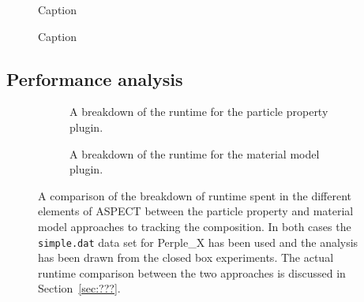 \begin{figure}
    \centering
    
    \caption{}
    \label{fig:decompression_batch}
\end{figure}

\begin{figure}
    \centering
    
    \caption{Caption}
    \label{fig:decompression_frac}
\end{figure}

\begin{figure}
    \centering
    
    \caption{Caption}
    \label{fig:decompression_2pp}
\end{figure}

\subsection{Performance analysis}

\begin{figure}
    \centering
    \begin{subfigure}{0.49\columnwidth}
        \centering
        \caption{A breakdown of the runtime for the particle property plugin.}
        \label{fig:perf_batch_pie}
    \end{subfigure}
    \hfill
    \begin{subfigure}{0.49\columnwidth}
        \centering
        \caption{A breakdown of the runtime for the material model plugin.}
        \label{fig:perf_2pp_pie}
    \end{subfigure}
    \caption{
        A comparison of the breakdown of runtime spent in the different elements of ASPECT between the particle property and material model approaches to tracking the composition.
        In both cases the \texttt{simple.dat} data set for Perple\_X has been used and the analysis has been drawn from the closed box experiments.
        The actual runtime comparison between the two approaches is discussed in Section~\ref{sec:???}.
    }
    \label{fig:perf_pie}
\end{figure}


